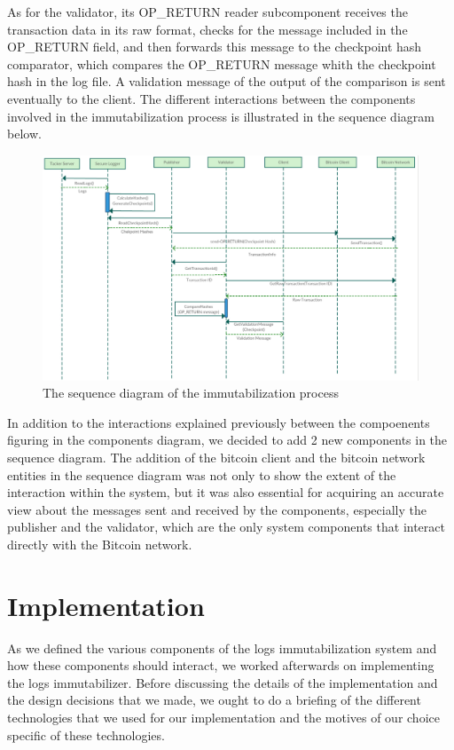 As for the validator, its OP\_RETURN reader subcomponent receives the transaction data in its raw format, checks for the message included in the OP\_RETURN field, and then forwards this message to the checkpoint hash comparator, which compares the OP\_RETURN message whith the checkpoint hash in the log file. A validation message of the output of the comparison is sent eventually to the client.
The different interactions between the components involved in the immutabilization process is illustrated in the sequence diagram below.
\newpage
\begin{figure}[htp]
    \centering
    \includegraphics[scale=0.32]{seq}
    \caption{The sequence diagram of the immutabilization process}
\end{figure}
In addition to the interactions explained previously between the compoenents figuring in the components diagram, we decided to add 2 new components in the sequence diagram. The addition of the bitcoin client and the bitcoin network entities in the sequence diagram was not only to show the extent of the interaction within the system, but it was also essential for acquiring an accurate view about the messages sent and received by the components, especially the publisher and the validator, which are the only system components that interact directly with the Bitcoin network.
\newpage
\section{Implementation}
As we defined the various components of the logs immutabilization system and how these components should interact, we worked afterwards on implementing the logs immutabilizer. Before discussing the details of the implementation and the design decisions that we made, we ought to do a briefing of the different technologies that we used for our implementation and the motives of our choice specific of these technologies.
